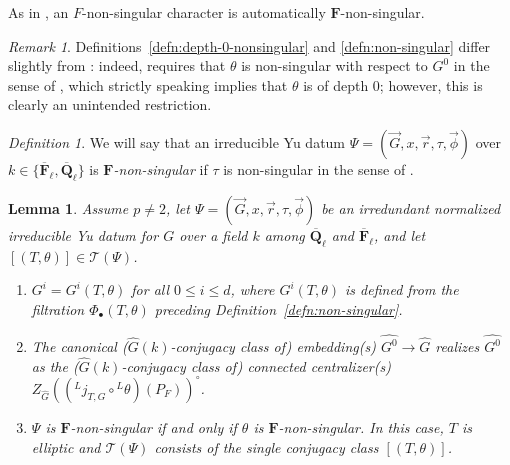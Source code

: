 \documentclass[reqno]{amsart}
\numberwithin{equation}{subsection}
\newcommand{\F}{\mathbf{F}}
\newcommand{\Q}{\mathbf{Q}}
\newcommand{\ol}[1]{\overline{#1}}
\newcommand{\wh}[1]{\widehat{#1}}
\newcommand{\ld}{{}^L}
\newcommand\cT{\mathcal{T}}
\newtheorem{lemma}[thm]{Lemma}
\theoremstyle{remark}
\newtheorem{remark}[thm]{Remark}
\newtheorem{defn}[thm]{Definition}
\numberwithin{equation}{subsection}
\numberwithin{figure}{subsection}
\begin{document}
As in \cite[Fact 3.1.4(1)]{Kal21b}, an $F$-non-singular character is automatically $\F$-non-singular.

\begin{remark}\label{rmk:difference-in-defn}
Definitions~\ref{defn:depth-0-nonsingular} and \ref{defn:non-singular} differ slightly from \cite[Definition 3.1.1, Definition 3.4.1]{Kal21b}: indeed, \cite[Definition 3.4.1]{Kal21b} requires that $\theta$ is non-singular with respect to $G^0$ in the sense of \cite[Definition 3.1.1]{Kal21b}, which strictly speaking implies that $\theta$ is of depth $0$; however, this is clearly an unintended restriction.
\end{remark}


\begin{defn}\label{defn:kF-non-singular-yu-datum}
We will say that an irreducible Yu datum $\Psi = (\vec{G},x,\vec{r},\tau,\vec{\phi})$ over $k \in \{\ol\F_\ell, \ol\Q_\ell\}$ is \textit{$\F$-non-singular} if $\tau$ is non-singular in the sense of \cite[Definition~2.9.3]{Cot26b}.
\end{defn}

\begin{lemma}\label{lemma:ns-yu-data-and-characters}
Assume $p \neq 2$, let $\Psi = (\vec{G}, x, \vec{r}, \tau, \vec{\phi})$ be an irredundant normalized irreducible Yu datum for $G$ over a field $k$ among $\ol\Q_\ell$ and $\ol\F_\ell$, and let $[(T, \theta)] \in \cT(\Psi)$.
\begin{enumerate}
    \item $G^i = G^i(T, \theta)$ for all $0\leq i\leq d$, where $G^i(T,\theta)$ is defined from the filtration $\Phi_\bullet(T,\theta)$ preceding Definition~\ref{defn:non-singular}.
    \item The canonical ($\wh G(k)$-conjugacy class of) embedding(s) $\wh{G^0} \to \wh G$ realizes $\wh{G^0}$ as the ($\wh G(k)$-conjugacy class of) connected centralizer(s) $Z_{\wh G}((\ld j_{T, G} \circ \ld\theta)(P_F))^\circ$.
    \item $\Psi$ is $\F$-non-singular if and only if $\theta$ is $\F$-non-singular. In this case, $T$ is elliptic and $\cT(\Psi)$ consists of the single conjugacy class $[(T, \theta)]$.
\end{enumerate}
\end{lemma}
\end{document}
